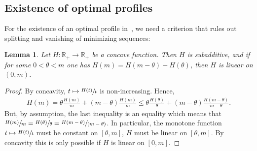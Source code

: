 \documentclass[JEP,XML,SOM,Unicode,published]{cedram}
\newcommand{\spfrac}[2]{{\sfrac{#1}{(#2)}}}
\theoremstyle{plain}
\newtheorem{lemma}[theorem]{Lemma}
\theoremstyle{definition}
\newcommand{\R}{\mathbb{R}}
\begin{document}
\subsection{Existence of optimal profiles}
For the existence of an optimal profile in~, we need a criterion that rules out splitting and vanishing of minimizing sequences:
\begin{lemma}\label{IndecomposableLinear}
Let \(H:\R_+\to\R_+\) be a concave function. Then $H$ is subadditive, and if for some \(0 < \theta < m\) one has \(H(m)=H(m-\theta)+H(\theta)\), then \(H\) is linear on \((0,m)\).
\end{lemma}
\begin{proof} By concavity, \(t\mapsto \sfrac{H(t)}{t}\) is non-increasing. Hence,
\begin{align*}
H(m)=\theta\frac{H(m)}{m}+(m-\theta)\frac{H(m)}{m}\leq \theta\frac{H(\theta)}{\theta}+(m-\theta)\frac{H(m-\theta)}{m-\theta}.
\end{align*}
But, by assumption, the last inequality is an equality which means that \(\sfrac{H(m)}{m}=\sfrac{H(\theta)}{\theta}=\spfrac{H(m-\theta)}{m-\theta}\). In particular, the monotone function \(t\mapsto \sfrac{H(t)}{t}\) must be constant on \([\theta,m]\), \ie \(H\) must be linear on \([\theta,m]\). By concavity this is only possible if \(H\) is linear on \([0,m]\).
\end{proof}
\end{document}
